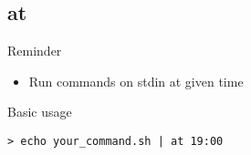 
\subsection{at}

\begin{frame}[fragile]{Reminder}
  \begin{itemize}
    \pause \item Run commands on stdin at given time
  \end{itemize}
  \pause

  \begin{exampleblock}{Basic usage}
    \begin{lstlisting}[showstringspaces=false]
> echo your_command.sh | at 19:00
    \end{lstlisting}
  \end{exampleblock}
\end{frame}


